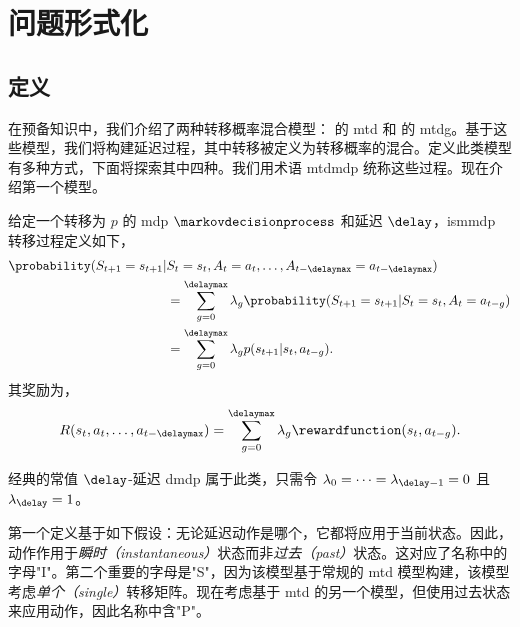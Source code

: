 \section{问题形式化}
\label{subsec:formalisation_mtdmdp}

\subsection{定义}

在预备知识中，我们介绍了两种转移概率混合模型： 的 \gls{mtd} 和  的 \gls{mtdg}。基于这些模型，我们将构建延迟过程，其中转移被定义为转移概率的混合。定义此类模型有多种方式，下面将探索其中四种。我们用术语 \gls{mtdmdp} 统称这些过程。现在介绍第一个模型。

\begin{defi}
    给定一个转移为 $p$ 的 \gls{mdp} $\markovdecisionprocess$ 和延迟 $\delay$，\gls{ismmdp} 转移过程定义如下，
    \begin{align*}
        \probability(S_{t+1}=s_{t+1}\vert& S_{t}=s_{t},A_{t}=a_{t},\dots,A_{t-\delaymax}=a_{t-\delaymax})
        \\
        &=\sum_{g=0}^\delaymax \lambda_g \probability(S_{t+1}=s_{t+1}\vert S_{t}=s_{t},A_{t}=a_{t-g})
        \\
        &= \sum_{g=0}^\delaymax \lambda_g p(s_{t+1}\vert s_{t},a_{t-g}).
    \end{align*}
    其奖励为，
    \begin{align*}
        R(s_{t},a_{t},\dots,a_{t-\delaymax}) = \sum_{g=0}^\delaymax \lambda_g \rewardfunction(s_{t},a_{t-g}).
    \end{align*}
\end{defi}


\begin{remark}
    经典的常值 $\delay$-延迟 \gls{dmdp} 属于此类，只需令 $\lambda_0=\dots=\lambda_{\delay-1}=0$ 且 $\lambda_\delay=1$。
\end{remark}

第一个定义基于如下假设：无论延迟动作是哪个，它都将应用于当前状态。因此，动作作用于\emph{瞬时（instantaneous）}状态而非\emph{过去（past）}状态。这对应了名称中的字母"I"。第二个重要的字母是"S"，因为该模型基于常规的 \gls{mtd} 模型构建，该模型考虑\emph{单个（single）}转移矩阵。现在考虑基于 \gls{mtd} 的另一个模型，但使用过去状态来应用动作，因此名称中含"P"。

